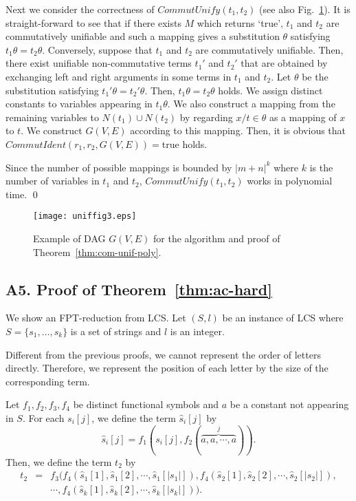 \documentclass[a4paper]{llncs}
\begin{document}
Next we consider the correctness of $CommutUnify(t_1,t_2)$
(see also Fig.~\ref{fig:dag}).
It is straight-forward to see that if there exists $M$ which returns `true',
$t_1$ and $t_2$ are commutatively unifiable and such a mapping
gives a substitution $\theta$ satisfying $t_1 \theta = t_2 \theta$.
Conversely, suppose that
$t_1$ and $t_2$ are commutatively unifiable.
Then,
there exist unifiable non-commutative terms $t_1'$ and $t_2'$
that are obtained by exchanging
left and right arguments in some terms in $t_1$ and $t_2$.
Let $\theta$ be the substitution satisfying $t_1' \theta = t_2' \theta$.
Then, $t_1 \theta = t_2 \theta$ holds.
We assign distinct constants to variables appearing in $t_1 \theta$.
We also construct a mapping from the remaining variables to $N(t_1) \cup N(t_2)$
by regarding $x/t \in \theta$ as a mapping of $x$ to $t$.
We construct $G(V,E)$ according to this mapping.
Then, it is obvious that $CommutIdent(r_1,r_2,G(V,E))=$true holds.

Since the number of possible mappings is bounded by $|m+n|^k$
where $k$ is the number of variables in $t_1$ and $t_2$,
$CommutUnify(t_1,t_2)$ works in polynomial time.
\qed

\begin{figure}[ht]
\begin{center}
\texttt{[image: uniffig3.eps]}
\caption{Example of DAG $G(V,E)$ for the algorithm and proof of Theorem~\ref{thm:com-unif-poly}.}
\label{fig:dag}
\end{center}
\end{figure}

\subsection*{A5. Proof of Theorem~\ref{thm:ac-hard}}

We show an FPT-reduction from LCS.
Let $(S,l)$ be an instance of LCS
where $S = \{s_1,\ldots,s_k\}$ is a set of strings and $l$ is an integer.

Different from the previous proofs,
we cannot represent the order of letters directly.
Therefore, we represent the position of each letter by
the size of the corresponding term.

Let $f_1,f_2,f_3,f_4$ be distinct functional symbols
and $a$ be a constant not appearing in $S$.
For each $s_i[j]$,
we define the term $\hat{s}_i[j]$ by
\[
\hat{s}_i[j] = f_1(s_i[j],f_2(\overbrace{a,a,\cdots,a}^{j})).
\]
Then, we define the term $t_2$ by
\begin{eqnarray*}
t_2 & = & f_3(f_4(\hat{s}_1[1],\hat{s}_1[2],\cdots,\hat{s}_1[|s_1|]),
f_4(\hat{s}_2[1],\hat{s}_2[2],\cdots,\hat{s}_2[|s_2|]),\\
& & \cdots,
f_4(\hat{s}_k[1],\hat{s}_k[2],\cdots,\hat{s}_k[|s_k|])).
\end{eqnarray*}
\end{document}
